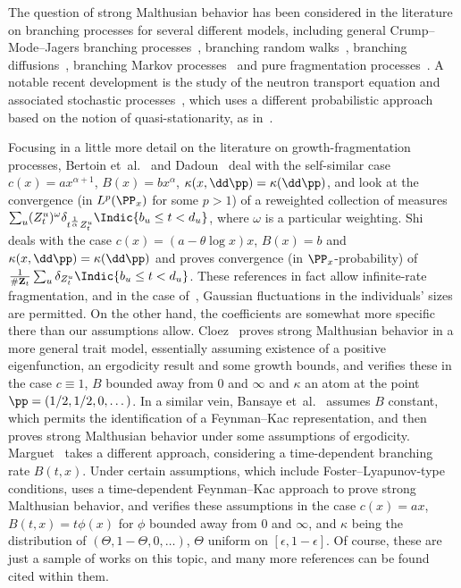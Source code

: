 The question of strong Malthusian behavior has been considered in the literature on branching processes for several different models, including general Crump--Mode--Jagers branching processes~\cite{Jagers,JN84,Nerman}, branching random walks~\cite{Biggins92}, branching diffusions~\cite{BBHHR, EnHaKy, GiHaHa, HaHa, HaHeKy}, branching Markov processes~\cite{AsHer, CRY, ChYu, Shio} and pure fragmentation processes~\cite{Beresty,Ber-frag,BeRou}. A notable recent development is the study of the neutron transport equation and associated stochastic processes~\cite{CHHK, HHK,HKV}, which uses a different probabilistic approach based on the notion of quasi-stationarity, as in~\cite{ChVil,CV-unbounded}.

Focusing in a little more detail on the literature on growth-fragmentation processes, Bertoin et~al.~\cite{BBCK} and Dadoun~\cite{Dadoun} deal with the self-similar case $c(x) = a x^{\alpha+1}$, $B(x) = bx^{\alpha}$, $\kappa(x,\dd \pp) = \kappa(\dd \pp)$, and look at the convergence (in $L^p(\PP_x)$ for some $p>1$) of a reweighted collection of measures $\sum_{u}(Z^u_t)^{\omega}\delta_{t^{\frac{1}{\alpha}}Z^u_t}\Indic{b_u\le t<d_u}$, where $\omega$ is a particular weighting. Shi~\cite{ShiQ-ou} deals with the case $c(x) = (a - \theta \log x)x$, $B(x) = b$ and $\kappa(x,\dd \pp) = \kappa(\dd \pp)$ and proves convergence (in $\PP_x$-probability) of $\frac{1}{\#\mathbf{Z}_t} \sum_{u} \delta_{Z^u_t} \Indic{b_u\le t < d_u}$. These references in fact allow infinite-rate fragmentation, and in the case of~\cite{ShiQ-ou}, Gaussian fluctuations in the individuals' sizes are permitted. On the other hand, the coefficients are somewhat more specific there than our \linebreak assumptions allow. Cloez~\cite{Cloez} proves strong Malthusian behavior in a more general trait model, essentially assuming existence of a positive eigenfunction, an ergodicity result and some growth bounds, and verifies these in the case $c\equiv 1$, $B$ bounded away from $0$ and $\infty$ and $\kappa$ an atom at the point $\pp = (1/2,1/2,0,\dotsc)$. In a similar vein, Bansaye et~al.~\cite{BDMT} assumes $B$ constant, which permits the identification of a Feynman--Kac representation, and then proves strong Malthusian behavior under some assumptions of ergodicity. Marguet~\cite{Mar-lln} takes a different approach, considering a time-dependent branching rate $B(t,x)$. Under certain assumptions, which include Foster--Lyapunov-type conditions, \cite{Mar-lln} uses a time-dependent Feynman--Kac approach to prove strong Malthusian behavior, and verifies these assumptions in the case $c(x) = ax$, $B(t,x) =t\phi(x)$ for $\phi$ bounded away from $0$ and $\infty$, and $\kappa$ being the distribution of $(\Theta,1-\Theta,0,\dotsc)$, $\Theta$ uniform on $[\epsilon,1-\epsilon]$. Of course, these are just a sample of works on this topic, and many more references can be found cited within them.


